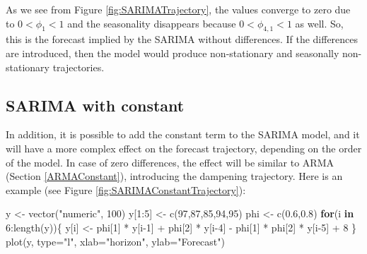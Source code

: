\documentclass[
]{book}
\newenvironment{Shaded}{\begin{snugshade}}{\end{snugshade}}
\newcommand{\AttributeTok}[1]{\textcolor[rgb]{0.77,0.63,0.00}{#1}}
\newcommand{\ControlFlowTok}[1]{\textcolor[rgb]{0.13,0.29,0.53}{\textbf{#1}}}
\newcommand{\DecValTok}[1]{\textcolor[rgb]{0.00,0.00,0.81}{#1}}
\newcommand{\FloatTok}[1]{\textcolor[rgb]{0.00,0.00,0.81}{#1}}
\newcommand{\FunctionTok}[1]{\textcolor[rgb]{0.00,0.00,0.00}{#1}}
\newcommand{\NormalTok}[1]{#1}
\newcommand{\OtherTok}[1]{\textcolor[rgb]{0.56,0.35,0.01}{#1}}
\newcommand{\SpecialCharTok}[1]{\textcolor[rgb]{0.00,0.00,0.00}{#1}}
\newcommand{\StringTok}[1]{\textcolor[rgb]{0.31,0.60,0.02}{#1}}
\theoremstyle{definition}
\theoremstyle{definition}
\theoremstyle{definition}
\theoremstyle{definition}
\theoremstyle{remark}
\begin{document}
As we see from Figure \ref{fig:SARIMATrajectory}, the values converge to zero due to \(0<\phi_1<1\) and the seasonality disappears because \(0<\phi_{4,1}<1\) as well. So, this is the forecast implied by the SARIMA without differences. If the differences are introduced, then the model would produce non-stationary and seasonally non-stationary trajectories.

\hypertarget{sarima-with-constant}{%
\subsection{SARIMA with constant}\label{sarima-with-constant}}

In addition, it is possible to add the constant term to the SARIMA model, and it will have a more complex effect on the forecast trajectory, depending on the order of the model. In case of zero differences, the effect will be similar to ARMA (Section \ref{ARMAConstant}), introducing the dampening trajectory. Here is an example (see Figure \ref{fig:SARIMAConstantTrajectory}):

\begin{Shaded}
\begin{Highlighting}[]
\NormalTok{y }\OtherTok{\textless{}{-}} \FunctionTok{vector}\NormalTok{(}\StringTok{"numeric"}\NormalTok{, }\DecValTok{100}\NormalTok{)}
\NormalTok{y[}\DecValTok{1}\SpecialCharTok{:}\DecValTok{5}\NormalTok{] }\OtherTok{\textless{}{-}} \FunctionTok{c}\NormalTok{(}\DecValTok{97}\NormalTok{,}\DecValTok{87}\NormalTok{,}\DecValTok{85}\NormalTok{,}\DecValTok{94}\NormalTok{,}\DecValTok{95}\NormalTok{)}
\NormalTok{phi }\OtherTok{\textless{}{-}} \FunctionTok{c}\NormalTok{(}\FloatTok{0.6}\NormalTok{,}\FloatTok{0.8}\NormalTok{)}
\ControlFlowTok{for}\NormalTok{(i }\ControlFlowTok{in} \DecValTok{6}\SpecialCharTok{:}\FunctionTok{length}\NormalTok{(y))\{}
\NormalTok{    y[i] }\OtherTok{\textless{}{-}}\NormalTok{ phi[}\DecValTok{1}\NormalTok{] }\SpecialCharTok{*}\NormalTok{ y[i}\DecValTok{{-}1}\NormalTok{] }\SpecialCharTok{+}\NormalTok{ phi[}\DecValTok{2}\NormalTok{] }\SpecialCharTok{*}\NormalTok{ y[i}\DecValTok{{-}4}\NormalTok{] }\SpecialCharTok{{-}}
\NormalTok{      phi[}\DecValTok{1}\NormalTok{] }\SpecialCharTok{*}\NormalTok{ phi[}\DecValTok{2}\NormalTok{] }\SpecialCharTok{*}\NormalTok{ y[i}\DecValTok{{-}5}\NormalTok{] }\SpecialCharTok{+} \DecValTok{8}
\NormalTok{\}}
\FunctionTok{plot}\NormalTok{(y, }\AttributeTok{type=}\StringTok{"l"}\NormalTok{, }\AttributeTok{xlab=}\StringTok{"horizon"}\NormalTok{, }\AttributeTok{ylab=}\StringTok{"Forecast"}\NormalTok{)}
\end{Highlighting}
\end{Shaded}
\end{document}
